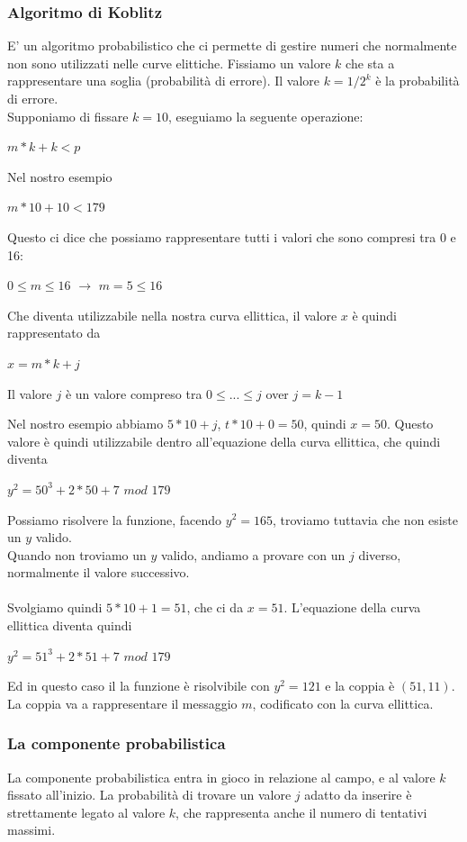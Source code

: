 \documentclass[11pt, oneside]{article}   	%
\begin{document}
\subsubsection*{Algoritmo di Koblitz}
E' un algoritmo probabilistico che ci permette di gestire numeri che normalmente non sono utilizzati nelle curve elittiche. Fissiamo un valore $k$ che sta a rappresentare una soglia (probabilità di errore).
Il valore $k = 1/2^k$ è la probabilità di errore. \\
Supponiamo di fissare $k = 10$, eseguiamo la seguente operazione:
\begin{center}
$m * k + k < p$
\end{center}
Nel nostro esempio 
\begin{center}
$m * 10 + 10 < 179$\\
\end{center}
Questo ci dice che possiamo rappresentare tutti i valori che sono compresi tra 0 e 16:
\begin{center}
$0 \leq m \leq 16$ $\rightarrow$ $m = 5 \leq 16$
\end{center}
Che diventa utilizzabile nella nostra curva ellittica, il valore $x$ è quindi rappresentato da 
\begin{center}
$x = m * k  + j$
\end{center}
Il valore $j$ è un valore compreso tra $0 \leq ... \leq j$ over $j = k - 1$

Nel nostro esempio abbiamo $5 * 10 + j$, $t * 10 +0 = 50$, quindi $x = 50$. Questo valore è quindi utilizzabile dentro all'equazione della curva ellittica, che quindi diventa
\begin{center}
$y^2 = 50^3 + 2*50 + 7$ $mod$ $179$
\end{center}
Possiamo risolvere la funzione, facendo $y^2 = 165$, troviamo tuttavia che non esiste un $y$ valido.\\
Quando non troviamo un $y$ valido, andiamo a provare con un $j$ diverso, normalmente il valore successivo.\\\\
Svolgiamo quindi $5 * 10 +1 = 51$, che ci da $x = 51$. L'equazione della curva ellittica diventa quindi
\begin{center}
$y^2 = 51^3 + 2*51 + 7$ $mod$ $179$ 
\end{center}
Ed in questo caso il la funzione è risolvibile con $y^2 = 121$ e la coppia è $(51, 11)$.
La coppia va a rappresentare il messaggio $m$, codificato con la curva ellittica. 

\subsubsection*{La componente probabilistica}
La componente probabilistica entra in gioco in relazione al campo, e al valore $k$ fissato all'inizio. La probabilità di trovare un valore $j$ adatto da inserire è strettamente legato al valore $k$, che rappresenta anche il numero di tentativi massimi.\\
\end{document}
